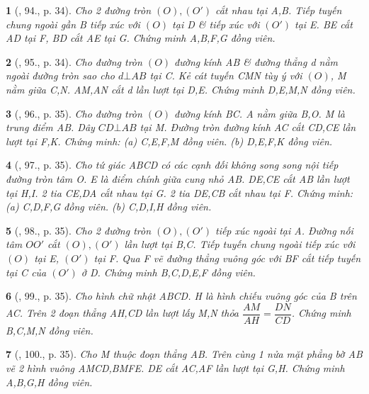 \documentclass{article}
\newtheorem{baitoan}{}
\begin{document}
\begin{baitoan}[\cite{Thu_Chung_Viet_Minh_circ}, 94., p. 34]
	Cho 2 đường tròn $(O),(O')$ cắt nhau tại A,B. Tiếp tuyến chung ngoài gần B tiếp xúc với $(O)$ tại D \& tiếp xúc với $(O')$ tại E. BE cắt AD tại F, BD cắt AE tại G. Chứng minh A,B,F,G đồng viên.
\end{baitoan}

\begin{baitoan}[\cite{Thu_Chung_Viet_Minh_circ}, 95., p. 34]
	Cho đường tròn $(O)$ đường kính AB \& đường thẳng d nằm ngoài đường tròn sao cho $d\bot AB$ tại C. Kẻ cát tuyến CMN tùy ý với $(O)$, M nằm giữa C,N. AM,AN cắt d lần lượt tại D,E. Chứng minh D,E,M,N đồng viên.
\end{baitoan}

\begin{baitoan}[\cite{Thu_Chung_Viet_Minh_circ}, 96., p. 35]
	Cho đường tròn $(O)$ đường kính BC. A nằm giữa B,O. M là trung điểm AB. Dây $CD\bot AB$ tại M. Đường tròn đường kính AC cắt CD,CE lần lượt tại F,K. Chứng minh: (a) C,E,F,M đồng viên. (b) D,E,F,K đồng viên.
\end{baitoan}

\begin{baitoan}[\cite{Thu_Chung_Viet_Minh_circ}, 97., p. 35]
	Cho tứ giác ABCD có các cạnh đối không song song nội tiếp đường tròn tâm O. E là điểm chính giữa cung nhỏ AB. DE,CE cắt AB lần lượt tại H,I. 2 tia CE,DA cắt nhau tại G. 2 tia DE,CB cắt nhau tại F. Chứng minh: (a) C,D,F,G đồng viên. (b) C,D,I,H đồng viên.
\end{baitoan}

\begin{baitoan}[\cite{Thu_Chung_Viet_Minh_circ}, 98., p. 35]
	Cho 2 đường tròn $(O),(O')$ tiếp xúc ngoài tại A. Đường nối tâm $OO'$ cắt $(O),(O')$ lần lượt tại B,C. Tiếp tuyến chung ngoài tiếp xúc với $(O)$ tại E, $(O')$ tại F. Qua F vẽ đường thẳng vuông góc với BF cắt tiếp tuyến tại C của $(O')$ ở D. Chứng minh B,C,D,E,F đồng viên.
\end{baitoan}

\begin{baitoan}[\cite{Thu_Chung_Viet_Minh_circ}, 99., p. 35]
	Cho hình chữ nhật ABCD. H là hình chiếu vuông góc của B trên AC. Trên 2 đoạn thẳng AH,CD lần lượt lấy M,N thỏa $\dfrac{AM}{AH} = \dfrac{DN}{CD}$. Chứng minh B,C,M,N đồng viên.
\end{baitoan}

\begin{baitoan}[\cite{Thu_Chung_Viet_Minh_circ}, 100., p. 35]
	Cho M thuộc đoạn thẳng AB. Trên cùng 1 nửa mặt phẳng bờ AB vẽ 2 hình vuông AMCD,BMFE. DE cắt AC,AF lần lượt tại G,H. Chứng minh A,B,G,H đồng viên.
\end{baitoan}
\end{document}

